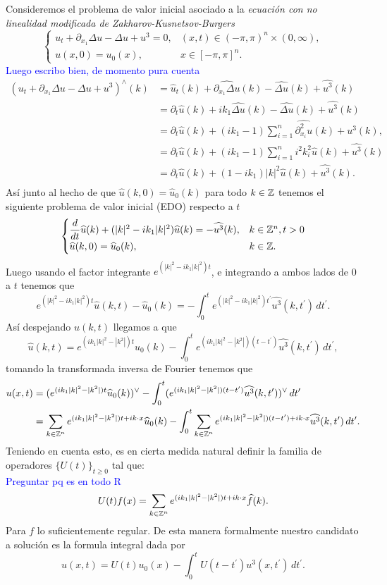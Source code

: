 Consideremos el problema de valor inicial asociado a la \textit{ecuación con no linealidad modificada de Zakharov-Kusnetsov-Burgers}
$$\begin{cases}
    u_t+\partial_{x_1}\Delta u-\Delta u+u^3=0, & (x,t)\in(-\pi,\pi)^n\times(0,\infty),\\
    u(x,0)=u_0(x), & x\in[-\pi,\pi]^n.
\end{cases}$$
\textcolor{blue}{Luego escribo bien, de momento pura cuenta}
\begin{align*}
   (u_t+\partial_{x_1}\Delta u-\Delta u+u^3)^{\wedge}(k)&= \widehat{u}_t(k)+\widehat{\partial_{x_1}\Delta u}(k)-\widehat{\Delta u}(k)+\widehat{u^3}(k)\\
   &=\partial_t\widehat{u}(k)+ik_1\widehat{\Delta u}(k)-\widehat{\Delta u}(k)+\widehat{u^3}(k)\\
   &=\partial_t\widehat{u}(k)+(ik_1-1)\sum_{i=1}^n\widehat{\partial^2_{x_i}u}(k)+\widehat{u^3}(k),\\
   &=\partial_t\widehat{u}(k)+(ik_1-1)\sum_{i=1}^ni^2k_i^2\widehat{u}(k)+\widehat{u^3}(k)\\
   &=\partial_t\widehat{u}(k)+(1-ik_1)|k|^2\widehat{u}(k)+\widehat{u^3}(k).\\
\end{align*}
Así junto al hecho de que $\widehat{u}(k,0)=\widehat{u}_0(k)$ para todo $k\in\mathbb{Z}$ tenemos el siguiente problema de valor inicial (EDO) respecto a $t$
$$\begin{cases}
    \dfrac{d}{dt}\widehat{u}(k)+(|k|^2-ik_1|k|^2)\widehat{u}(k)=-\widehat{u^3}(k), & k\in\mathbb{Z}^n,t>0\\
    \widehat{u}(k,0)=\widehat{u}_0(k), &k\in\mathbb{Z}.
\end{cases}$$
Luego usando el factor integrante $e^{(|k|^2-ik_1|k|^2)t}$, e integrando a ambos lados de 0 a $t$ tenemos que
$$e^{(|k|^2-ik_1|k|^2)t}\widehat{u}(k,t)-\widehat{u}_0(k)=-\int_0^te^{(|k|^2-ik_1|k|^2)t^\prime}\widehat{u^3}(k,t^\prime)\,dt^\prime.$$
Así despejando $\widehat{u}(k,t)$ llegamos a que
$$\widehat{u}(k,t)=e^{(ik_1|k|^2-|k^2|)t}\widehat{u}_0(k)-\int_0^te^{(ik_1|k|^2-|k^2|)(t-t^\prime)}\widehat{u^3}(k,t^\prime)\,dt^\prime,$$
tomando la transformada inversa de Fourier tenemos que
\begin{align*}
    u(x,t)&=(e^{(ik_1|k|^2-|k^2|)t}\widehat{u}_0(k))^{\vee}-\int_0^t(e^{(ik_1|k|^2-|k^2|)(t-t^\prime)}\widehat{u^3}(k,t^\prime))^{\vee}\,dt^\prime\\
    &=\sum_{k\in\mathbb{Z}^n}e^{(ik_1|k|^2-|k^2|)t+ik\cdot x}\widehat{u}_0(k)-\int_0^t\sum_{k\in\mathbb{Z}^n}e^{(ik_1|k|^2-|k^2|)(t-t^\prime)+ik\cdot x}\widehat{u^3}(k,t^\prime)\,dt^\prime.
\end{align*}
Teniendo en cuenta esto, es en cierta medida natural definir la familia de operadores $\{U(t)\}_{t\geq 0}$ tal que:\\

\textcolor{blue}{Preguntar pq es en todo R}\\
$$U(t)f(x)=\sum_{k\in\mathbb{Z}^n}e^{(ik_1|k|^2-|k^2|)t+ik\cdot x}\widehat{f}(k).$$
Para $f$ lo suficientemente regular. De esta manera formalmente nuestro candidato a solución es la formula integral dada por
$$u(x,t)=U(t)u_0(x)-\int_0^tU(t-t^\prime)u^3(x,t^\prime)\,dt^\prime.$$
